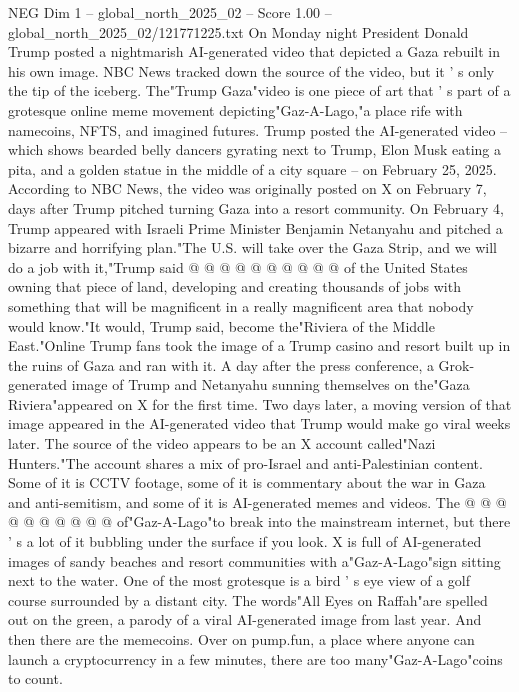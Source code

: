 \begin{textsample}{NEG Dim 1 – global\_north\_2025\_02 – Score 1.00 – global\_north\_2025\_02/121771225.txt}  \label{ex:f1_neg_005}
On Monday night President Donald Trump posted a nightmarish AI-generated video that depicted a Gaza rebuilt in his own image.
NBC News tracked down the source of the video, but it ' s only the tip of the iceberg.
The"Trump Gaza"video is one piece of art that ' s part of a grotesque online meme movement depicting"Gaz-A-Lago,"a place rife with namecoins, NFTS, and imagined futures.
Trump posted the AI-generated video -- which shows bearded belly dancers gyrating next to Trump, Elon Musk eating a pita, and a golden statue in the middle of a city square -- on February 25, 2025.
According to NBC News, the video was originally posted on X on February 7, days after Trump pitched turning Gaza into a resort community.
On February 4, Trump appeared with Israeli Prime Minister Benjamin Netanyahu and pitched a bizarre and horrifying plan."The U.S. will take over the Gaza Strip, and we will do a job with it,"Trump said @ @ @ @ @ @ @ @ @ @ of the United States owning that piece of land, developing and creating thousands of jobs with something that will be magnificent in a really magnificent area that nobody would know."It would, Trump said, become the"Riviera of the Middle East."Online Trump fans took the image of a Trump casino and resort built up in the ruins of Gaza and ran with it.
A day after the press conference, a Grok-generated image of Trump and Netanyahu sunning themselves on the"Gaza Riviera"appeared on X for the first time.
Two days later, a moving version of that image appeared in the AI-generated video that Trump would make go viral weeks later.
The source of the video appears to be an X account called"Nazi Hunters."The account shares a mix of pro-Israel and anti-Palestinian content.
Some of it is CCTV footage, some of it is commentary about the war in Gaza and anti-semitism, and some of it is AI-generated memes and videos.
The @ @ @ @ @ @ @ @ @ @ of"Gaz-A-Lago"to break into the mainstream internet, but there ' s a lot of it bubbling under the surface if you look.
X is full of AI-generated images of sandy beaches and resort communities with a"Gaz-A-Lago"sign sitting next to the water.
One of the most grotesque is a bird ' s eye view of a golf course surrounded by a distant city.
The words"All Eyes on Raffah"are spelled out on the green, a parody of a viral AI-generated image from last year.
And then there are the memecoins.
Over on pump.fun, a place where anyone can launch a cryptocurrency in a few minutes, there are too many"Gaz-A-Lago"coins to count.

\end{textsample}
